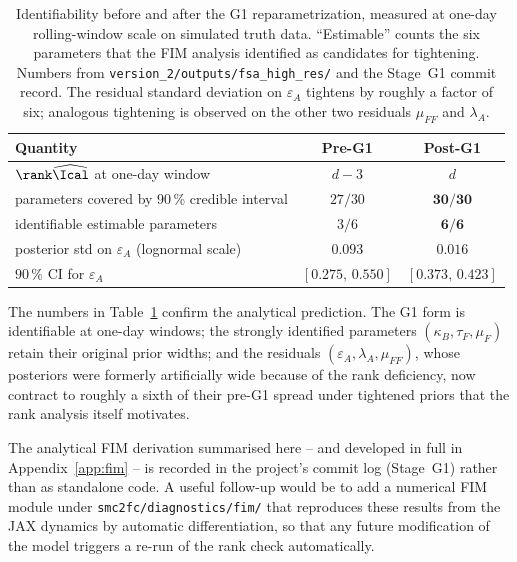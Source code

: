\begin{table}[h]
\centering
\small
\begin{tabular}{@{}lcc@{}}
\toprule
Quantity & Pre-G1 & Post-G1 \\
\midrule
$\rank \widehat{\Ical}$ at one-day window               & $d-3$            & $d$ \\
parameters covered by 90\,\% credible interval          & $27/30$          & $\mathbf{30/30}$ \\
identifiable estimable parameters                       & $3/6$            & $\mathbf{6/6}$ \\
posterior std on $\varepsilon_A$ (lognormal scale)      & $0.093$          & $\mathbf{0.016}$ \\
$90\,\%$ CI for $\varepsilon_A$                         & $[0.275,\,0.550]$ & $\mathbf{[0.373,\,0.423]}$ \\
\bottomrule
\end{tabular}
\caption{Identifiability before and after the G1 reparametrization,
measured at one-day rolling-window scale on simulated truth data.
``Estimable'' counts the six parameters that the FIM analysis
identified as candidates for tightening. Numbers from
\texttt{version\_2/outputs/fsa\_high\_res/} and the Stage~G1 commit
record. The residual standard deviation on $\varepsilon_A$ tightens
by roughly a factor of six; analogous tightening is observed on the
other two residuals $\mu_{FF}$ and $\lambda_A$.}
\label{tab:g1-evidence}
\end{table}

The numbers in Table~\ref{tab:g1-evidence} confirm the analytical
prediction. The G1 form is identifiable at one-day windows; the
strongly identified parameters $(\kappa_B, \tau_F, \mu_F)$ retain
their original prior widths; and the residuals
$(\varepsilon_A, \lambda_A, \mu_{FF})$, whose posteriors were
formerly artificially wide because of the rank deficiency, now
contract to roughly a sixth of their pre-G1 spread under tightened
priors that the rank analysis itself motivates.

\begin{remark}\label{rem:fim-where}
The analytical FIM derivation summarised here -- and developed in
full in Appendix~\ref{app:fim} -- is recorded in the project's
commit log (Stage~G1) rather than as standalone code. A useful
follow-up would be to add a numerical FIM module under
\texttt{smc2fc/diagnostics/fim/} that reproduces these results from
the JAX dynamics by automatic differentiation, so that any future
modification of the model triggers a re-run of the rank check
automatically.
\end{remark}
